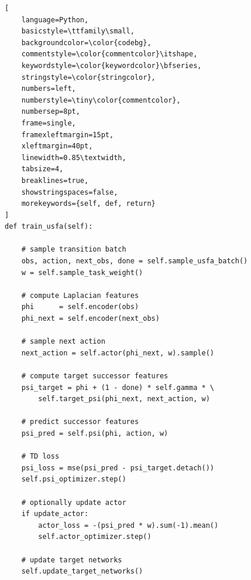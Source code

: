 \documentclass{article}
\theoremstyle{plain}
\theoremstyle{definition}
\theoremstyle{remark}
\begin{document}
\begin{lstlisting}[
    language=Python,
    basicstyle=\ttfamily\small,
    backgroundcolor=\color{codebg},
    commentstyle=\color{commentcolor}\itshape,
    keywordstyle=\color{keywordcolor}\bfseries,
    stringstyle=\color{stringcolor},
    numbers=left,
    numberstyle=\tiny\color{commentcolor},
    numbersep=8pt,
    frame=single,
    framexleftmargin=15pt,
    xleftmargin=40pt,
    linewidth=0.85\textwidth,
    tabsize=4,
    breaklines=true,
    showstringspaces=false,
    morekeywords={self, def, return}
]
def train_usfa(self):

    # sample transition batch
    obs, action, next_obs, done = self.sample_usfa_batch()
    w = self.sample_task_weight()

    # compute Laplacian features
    phi      = self.encoder(obs)
    phi_next = self.encoder(next_obs)

    # sample next action
    next_action = self.actor(phi_next, w).sample()

    # compute target successor features
    psi_target = phi + (1 - done) * self.gamma * \
        self.target_psi(phi_next, next_action, w)

    # predict successor features
    psi_pred = self.psi(phi, action, w)

    # TD loss
    psi_loss = mse(psi_pred - psi_target.detach())
    self.psi_optimizer.step()

    # optionally update actor
    if update_actor:
        actor_loss = -(psi_pred * w).sum(-1).mean()
        self.actor_optimizer.step()

    # update target networks
    self.update_target_networks()
\end{lstlisting}


\newpage
\end{document}
